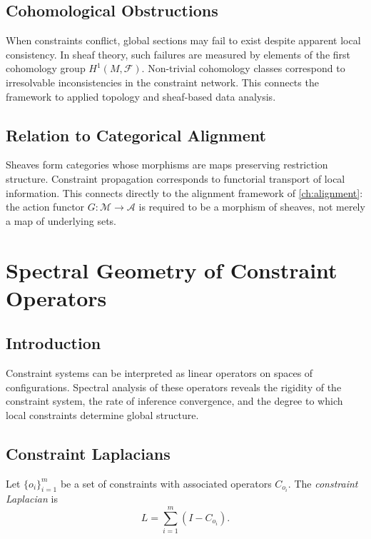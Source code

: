 \documentclass[12pt,a4paper,oneside]{book}
\numberwithin{equation}{chapter}
\theoremstyle{plain}
\theoremstyle{definition}
\theoremstyle{remark}
\begin{document}
\section{Cohomological Obstructions}

When constraints conflict, global sections may fail to exist despite
apparent local consistency. In sheaf theory, such failures are
measured by elements of the first cohomology group $H^1(M,\mathcal{F})$.
Non-trivial cohomology classes correspond to irresolvable
inconsistencies in the constraint network. This connects the
framework to applied topology and sheaf-based data analysis.

\section{Relation to Categorical Alignment}

Sheaves form categories whose morphisms are maps preserving
restriction structure. Constraint propagation corresponds to
functorial transport of local information. This connects directly to
the alignment framework of \cref{ch:alignment}: the action functor
$G : \mathcal{M} \rightarrow \mathcal{A}$ is required to be a
morphism of sheaves, not merely a map of underlying sets.


\chapter{Spectral Geometry of Constraint Operators}
\label{ch:spectral-constraints}

\section{Introduction}

Constraint systems can be interpreted as linear operators on spaces
of configurations. Spectral analysis of these operators reveals the
rigidity of the constraint system, the rate of inference convergence,
and the degree to which local constraints determine global structure.

\section{Constraint Laplacians}

Let $\{o_i\}_{i=1}^m$ be a set of constraints with associated
operators $C_{o_i}$. The \emph{constraint Laplacian} is
\[
L = \sum_{i=1}^m (I - C_{o_i}).
\]
\end{document}
